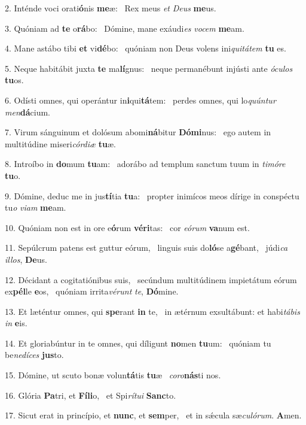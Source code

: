 2. Inténde voci orati\textbf{ó}nis \textbf{me}æ: \ast\  Rex meus \textit{et} \textit{De}\textit{us} \textbf{me}us.\

3. Quóniam ad \textbf{te} o\textbf{rá}bo: \ast\  Dómine, mane exáudi\textit{es} \textit{vo}\textit{cem} \textbf{me}am.\

4. Mane astábo tibi \textbf{et} vi\textbf{dé}bo: \ast\  quóniam non Deus volens ini\textit{qui}\textit{tá}\textit{tem} \textbf{tu} es.\

5. Neque habitábit juxta \textbf{te} ma\textbf{lí}gnus: \ast\  neque permanébunt injústi ante \textit{ó}\textit{cu}\textit{los} \textbf{tu}os.\

6. Odísti omnes, qui operántur in\textbf{i}qui\textbf{tá}tem: \ast\  perdes omnes, qui lo\textit{quún}\textit{tur} \textit{men}\textbf{dá}cium.\

7. Virum sánguinum et dolósum abomi\textbf{ná}bitur \textbf{Dó}\textbf{mi}nus: \ast\  ego autem in multitúdine miseri\textit{cór}\textit{di}\textit{æ} \textbf{tu}æ.\

8. Introíbo in \textbf{do}mum \textbf{tu}am: \ast\  adorábo ad templum sanctum tuum in \textit{ti}\textit{mó}\textit{re} \textbf{tu}o.\

9. Dómine, deduc me in jus\textbf{tí}tia \textbf{tu}a: \ast\  propter inimícos meos dírige in conspéctu tu\textit{o} \textit{vi}\textit{am} \textbf{me}am.\

10. Quóniam non est in ore e\textbf{ó}rum \textbf{vé}\textbf{ri}tas: \ast\  cor \textit{e}\textit{ó}\textit{rum} \textbf{va}num est.\

11. Sepúlcrum patens est guttur eórum, \dag\  linguis suis do\textbf{ló}se a\textbf{gé}bant, \ast\  júdi\textit{ca} \textit{il}\textit{los}, \textbf{De}us.\

12. Décidant a cogitatiónibus suis, \dag\  secúndum multitúdinem impietátum eórum ex\textbf{pél}le \textbf{e}os, \ast\  quóniam irrita\textit{vé}\textit{runt} \textit{te}, \textbf{Dó}mine.\

13. Et læténtur omnes, qui \textbf{spe}rant \textbf{in} te, \ast\  in ætérnum exsultábunt: et habi\textit{tá}\textit{bis} \textit{in} \textbf{e}is.\

14. Et gloriabúntur in te omnes, qui díligunt \textbf{no}men \textbf{tu}um: \ast\  quóniam tu be\textit{ne}\textit{dí}\textit{ces} \textbf{jus}to.\

15. Dómine, ut scuto bonæ volun\textbf{tá}tis \textbf{tu}æ \ast\  \textit{co}\textit{ro}\textbf{nás}ti nos.\

16. Glória \textbf{Pa}tri, et \textbf{Fí}\textbf{li}o, \ast\  et Spi\textit{rí}\textit{tu}\textit{i} \textbf{Sanc}to.\

17. Sicut erat in princípio, et \textbf{nunc}, et \textbf{sem}per, \ast\  et in sǽcula sæ\textit{cu}\textit{ló}\textit{rum}. \textbf{A}men.\

